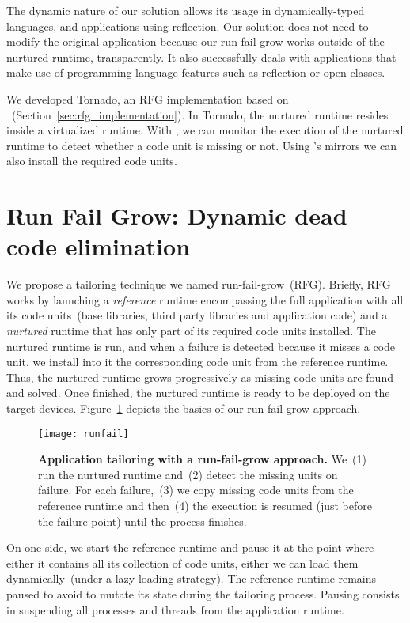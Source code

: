The dynamic nature of our solution allows its usage in dynamically-typed languages, and applications using reflection. Our solution does not need to modify the original application because our run-fail-grow works outside of the nurtured runtime, transparently.
It also successfully deals with applications that make use of programming language features such as reflection or open classes.

We developed Tornado, an RFG implementation based on \Vtt~(Section~\ref{sec:rfg_implementation}). In Tornado, the nurtured runtime resides inside a virtualized runtime. With \Vtt, we can monitor the execution of the nurtured runtime to detect whether a code unit is missing or not. Using \Vtt's mirrors we can also install the required code units.

\section{Run Fail Grow: Dynamic dead code elimination}\label{sec:rfg_model}

We propose a tailoring technique we named run-fail-grow~(RFG). Briefly, RFG works by launching a \emph{reference} runtime encompassing the full application with all its code units~(base libraries, third party libraries and application code) and a \emph{nurtured} runtime that has only part of its required code units installed. The nurtured runtime is run, and when a failure is detected because it misses a code unit, we install into it the corresponding code unit from the reference runtime. Thus, the nurtured runtime grows progressively as missing code units are found and solved.
Once finished, the nurtured runtime is ready to be deployed on the target devices. Figure~\ref{fig:runfail} depicts the basics of our run-fail-grow approach.

\begin{figure}[ht]
\begin{center}
\texttt{[image: runfail]}
\caption{\textbf{Application tailoring with a run-fail-grow approach.} We~(1) run the nurtured runtime and~(2) detect the missing units on failure. For each failure,~(3) we copy missing code units from the reference runtime and then~(4) the execution is resumed (just before the failure point) until the process finishes. \label{fig:runfail}}
\end{center}
\end{figure}

On one side, we start the reference runtime and pause it at the point where either it contains all its collection of code units, either we can load them dynamically~(under a lazy loading strategy). The reference runtime remains paused to avoid to mutate its state during the tailoring process. Pausing consists in suspending all processes and threads from the application runtime.

